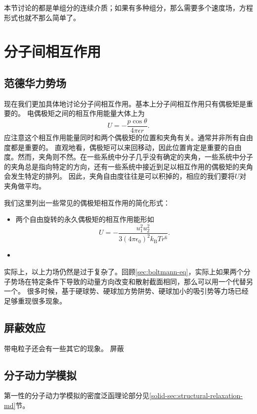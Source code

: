 本节讨论的都是单组分的连续介质；如果有多种组分，那么需要多个速度场，方程形式也就不那么简单了。

\section{分子间相互作用}\label{sec:molecular-interaction}

\subsection{范德华力势场}

现在我们更加具体地讨论分子间相互作用。基本上分子间相互作用只有偶极矩是重要的。
电偶极矩之间的相互作用能量大体上为
\begin{equation}
    U = - \frac{p \cos \theta}{4 \pi \epsilon r}.
\end{equation}
应注意这个相互作用能量同时和两个偶极矩的位置和夹角有关。通常并非所有自由度都是重要的。
直观地看，偶极矩可以来回移动，因此位置肯定是重要的自由度。然而，夹角则不然。在一些系统中分子几乎没有确定的夹角，一些系统中分子的夹角总是指向特定的方向，还有一些系统中接近到足以相互作用的偶极矩的夹角会发生特定的排列。
因此，夹角自由度往往是可以积掉的，相应的我们要将$U$对夹角做平均。

我们这里列出一些常见的偶极矩相互作用的简化形式：
\begin{itemize}
    \item 两个自由旋转的永久偶极矩的相互作用能形如
    \begin{equation}
        U = - \frac{u_1^2 u_2^2}{3 (4\pi\epsilon_0)^2 k_\text{B}T r^6}.
    \end{equation}
    \item 
\end{itemize}

实际上，以上力场仍然是过于复杂了。回顾\autoref{sec:boltmann-eq}，实际上如果两个分子势场在特定条件下导致的动量方向改变和散射截面相同，那么可以用一个代替另一个。
很多时候，基于硬球势、硬球加方势阱势、硬球加小的吸引势等力场已经足够重现很多现象。

\subsection{屏蔽效应}

带电粒子还会有一些其它的现象。 屏蔽

\subsection{分子动力学模拟}

第一性的分子动力学模拟的密度泛函理论部分见\ref{solid-sec:structural-relaxation-md}节。